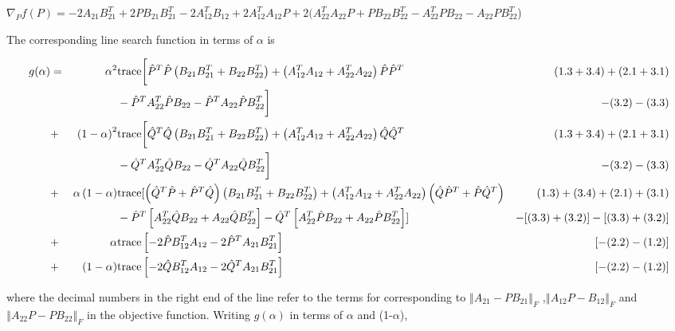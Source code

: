 \documentclass[12pt]{article}
\newcommand{\tr}{\textup{trace}}
\begin{document}
$\nabla_{P}f(P)=-2A_{21}B_{21}^{T}+2PB_{21}B_{21}^{T}-2A_{12}^{T}B_{12}+2A_{12}^{T}A_{12}P+2(A_{22}^{T}A_{22}P+PB_{22}B_{22}^{T}-A_{22}^{T}PB_{22}-A_{22}PB_{22}^{T}$)

\begin{flushleft}
The corresponding line search function in terms of $\alpha$ is
\par\end{flushleft}

\begin{flushleft}
\begin{align*}
g(\alpha) & = & \alpha^{2} & \tr\biggl[\hat{P}^{T}\hat{P}\left(B_{21}B_{21}^{T}+B_{22}B_{22}^{T}\right)+\left(A_{12}^{T}A_{12}+A_{22}^{T}A_{22}\right)\hat{P}\hat{P}^{T} & (1.3+3.4)+(2.1+3.1)\\
 &  &  & -\hat{P}^{T}A_{22}^{T}\hat{P}B_{22}-\hat{P}^{T}A_{22}\hat{P}B_{22}^{T}\biggr] & -(3.2)-(3.3)\\
 & + & \left(1-\alpha\right)^{2} & \tr\biggl[\hat{Q}^{T}\hat{Q}\left(B_{21}B_{21}^{T}+B_{22}B_{22}^{T}\right)+\left(A_{12}^{T}A_{12}+A_{22}^{T}A_{22}\right)\hat{Q}\hat{Q}^{T} & (1.3+3.4)+(2.1+3.1)\\
 &  &  & -\hat{Q}^{T}A_{22}^{T}\hat{Q}B_{22}-\hat{Q}^{T}A_{22}\hat{Q}B_{22}^{T}\biggr] & -(3.2)-(3.3)\\
 & + & \alpha\left(1-\alpha\right) & \tr[\left(\hat{Q}^{T}\hat{P}+\hat{P}^{T}\hat{Q}\right)\left(B_{21}B_{21}^{T}+B_{22}B_{22}^{T}\right)+\left(A_{12}^{T}A_{12}+A_{22}^{T}A_{22}\right)\left(\hat{Q}\hat{P}^{T}+\hat{P}\hat{Q}^{T}\right) & (1.3)+(3.4)+(2.1)+(3.1)\\
 &  &  & -\hat{P}^{T}\left[A_{22}^{T}\hat{Q}B_{22}+A_{22}\hat{Q}B_{22}^{T}\right]-\hat{Q}^{T}\left[A_{22}^{T}\hat{P}B_{22}+A_{22}\hat{P}B_{22}^{T}\right]] & -[(3.3)+(3.2)]-[(3.3)+(3.2)]\\
 & + & \alpha & \tr\left[-2\hat{P}B_{12}^{T}A_{12}-2\hat{P}^{T}A_{21}B_{21}^{T}\right] & [-(2.2)-(1.2)]\\
 & + & \left(1-\alpha\right) & \tr\left[-2\hat{Q}B_{12}^{T}A_{12}-2\hat{Q}^{T}A_{21}B_{21}^{T}\right] & [-(2.2)-(1.2)]
\end{align*}

\par\end{flushleft}

where the decimal numbers in the right end of the line refer to the
terms for corresponding to $\left\Vert A_{21}-PB_{21}\right\Vert _{F}$
,$\left\Vert A_{12}P-B_{12}\right\Vert _{F}$ and $\left\Vert A_{22}P-PB_{22}\right\Vert _{F}$
in the objective function. Writing $g\left(\alpha\right)$ in terms
of $\alpha$ and (1-$\alpha$),
\end{document}
